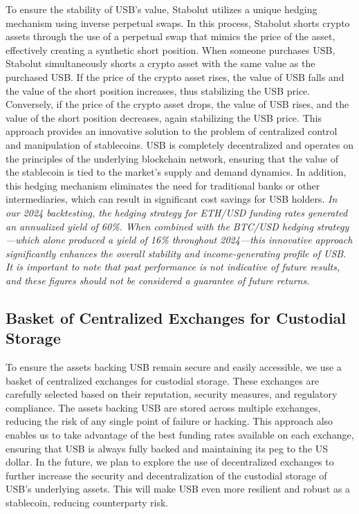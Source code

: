 To ensure the stability of USB's value, Stabolut utilizes a unique hedging mechanism using inverse perpetual swaps.
In this process, Stabolut shorts crypto assets through the use of a perpetual swap that mimics the price of the asset, effectively creating a synthetic short position.\newline
When someone purchases USB, Stabolut simultaneously shorts a crypto asset with the same value as the purchased USB.
If the price of the crypto asset rises, the value of USB falls and the value of the short position increases, thus stabilizing the USB price.
Conversely, if the price of the crypto asset drops, the value of USB rises, and the value of the short position decreases, again stabilizing the USB price.\newline
This approach provides an innovative solution to the problem of centralized control and manipulation of stablecoins.
USB is completely decentralized and operates on the principles of the underlying blockchain network, ensuring that the value of the stablecoin is tied to the market's supply and demand dynamics.\newline
In addition, this hedging mechanism eliminates the need for traditional banks or other intermediaries, which can result in significant cost savings for USB holders.
\newline
\textit{In our 2024 backtesting, the hedging strategy for ETH/USD funding rates generated an annualized yield of 60\%. When combined with the BTC/USD hedging strategy—which alone produced a yield of 16\% throughout 2024—this innovative approach significantly enhances the overall stability and income-generating profile of USB. It is important to note that past performance is not indicative of future results, and these figures should not be considered a guarantee of future returns.} 


\subsection{Basket of Centralized Exchanges for Custodial Storage}
To ensure the assets backing USB remain secure and easily accessible, we use a basket of centralized exchanges for custodial storage.
These exchanges are carefully selected based on their reputation, security measures, and regulatory compliance.\newline
The assets backing USB are stored across multiple exchanges, reducing the risk of any single point of failure or hacking.
This approach also enables us to take advantage of the best funding rates available on each exchange, ensuring that USB is always fully backed and maintaining its peg to the US dollar.\newline
In the future, we plan to explore the use of decentralized exchanges to further increase the security and decentralization of the custodial storage of USB's underlying assets. 
This will make USB even more resilient and robust as a stablecoin, reducing counterparty risk.


